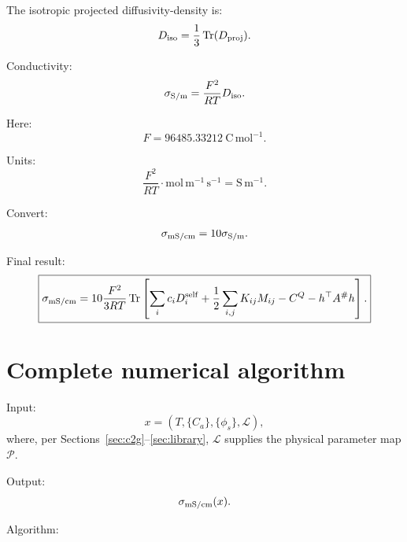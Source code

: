 \documentclass[11pt]{article}
\newcommand{\Tr}{\operatorname{Tr}}
\begin{document}
The isotropic projected diffusivity-density is:
\[
D_{\rm iso}
=
\frac13\Tr(D_{\rm proj}).
\]

Conductivity:
\[
\sigma_{\rm S/m}
=
\frac{F^2}{RT}D_{\rm iso}.
\]

Here:
\[
F=96485.33212\ \mathrm{C\,mol^{-1}}.
\]

Units:
\[
\frac{F^2}{RT}
\cdot
\mathrm{mol\,m^{-1}\,s^{-1}}
=
\mathrm{S\,m^{-1}}.
\]

Convert:
\[
\sigma_{\rm mS/cm}=10\sigma_{\rm S/m}.
\]

Final result:
\[
\boxed{
\sigma_{\rm mS/cm}
=
10\frac{F^2}{3RT}
\Tr
\left[
\sum_i c_iD_i^{\rm self}
+
\frac12\sum_{i,j}K_{ij}M_{ij}
-
C^Q
-
h^\top A^\#h
\right].
}
\]

\section{Complete numerical algorithm}
\label{sec:algorithm}

Input:
\[
x=(T,\{C_a\},\{\phi_s\},\mathcal L),
\]
where, per Sections~\ref{sec:c2g}--\ref{sec:library}, \(\mathcal L\) supplies
the physical parameter map \(\mathcal P\).

Output:
\[
\sigma_{\rm mS/cm}(x).
\]

Algorithm:
\end{document}
